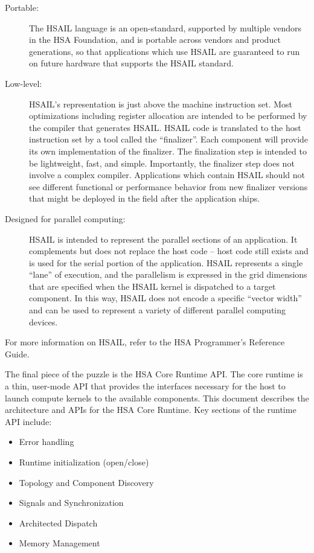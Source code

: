 \documentclass{book}
\begin{document}
\begin{description}
\item[Portable:] The HSAIL language is an open-standard, supported by
multiple vendors in the HSA Foundation, and is portable across
vendors and product generations, so that applications which use
HSAIL are guaranteed to run on future hardware that supports the
HSAIL standard.
\item[Low-level:] HSAIL’s representation is just above the machine
instruction set.  Most optimizations including register allocation
are intended to be performed by the compiler that generates HSAIL.
HSAIL code is translated to the host instruction set by a tool
called the “finalizer”.  Each component will provide its own
implementation of the finalizer.  The finalization step is intended
to be lightweight, fast, and simple.  Importantly, the finalizer
step does not involve a complex compiler.  Applications which
contain HSAIL should not see different functional or performance
behavior from new finalizer versions that might be deployed in the
field after the application ships.
\item[Designed for parallel computing:] HSAIL is intended to represent
the parallel sections of an application.  It complements but does
not replace the host code – host code still exists and is used for
the serial portion of the application.  HSAIL represents a single
“lane” of execution, and the parallelism is expressed in the grid
dimensions that are specified when the HSAIL kernel is dispatched to
a target component.  In this way, HSAIL does not encode a specific
“vector width” and can be used to represent a variety of different
parallel computing devices.
\end{description}

For more information on HSAIL, refer to the HSA Programmer’s
Reference Guide.

The final piece of the puzzle is the HSA Core Runtime API.  The core
runtime is a thin, user-mode API that provides the interfaces
necessary for the host to launch compute kernels to the available
components.  This document describes the architecture and APIs for
the HSA Core Runtime.  Key sections of the runtime API include:

\begin{itemize}
\item Error handling
\item Runtime initialization (open/close)
\item Topology and Component Discovery
\item Signals and Synchronization
\item Architected Dispatch
\item Memory Management
\end{itemize}
\end{document}
